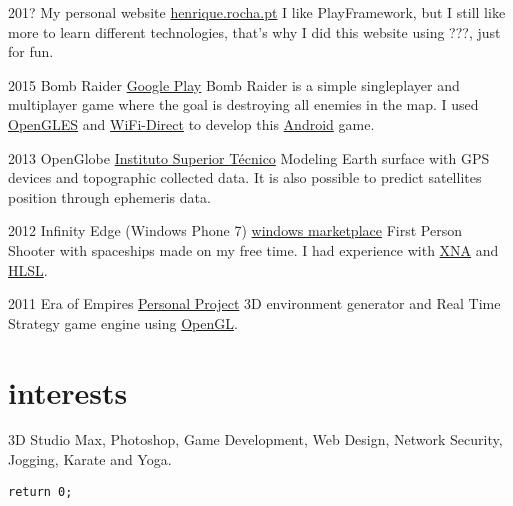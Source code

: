 \documentclass[]{friggeri-cv}
\begin{document}
\begin{entrylist}
  \entry
    {201?}
    {My personal website}
    {\href{http://play.google.com/store/apps/details?id=pt.ist.bombraider}{henrique.rocha.pt}}
    {I like PlayFramework, but I still like more to learn different technologies, that's why I did this website using ???, just for fun.}
  
  \entry
    {2015}
    {Bomb Raider}
    {\href{http://play.google.com/store/apps/details?id=pt.ist.bombraider}{Google Play}}
    {Bomb Raider is a simple singleplayer and multiplayer game where the goal is destroying all enemies in the map. I used \underline{OpenGLES} and \underline{WiFi-Direct} to develop this \underline{Android} game.}

  \entry
    {2013}
    {OpenGlobe}
    {\href{http://web.ist.utl.pt/ist168621/?page=10}{Instituto Superior Técnico}}
    {Modeling Earth surface with GPS devices and topographic collected data. It is also possible to predict satellites position through ephemeris data.}

  \entry
    {2012}
    {Infinity Edge (Windows Phone 7)}
    {\href{http://www.windowsphone.com/en-us/store/app/infinity-edge/05516463-3a89-4351-996e-62e5b4519aeb}{windows marketplace}}
    {First Person Shooter with spaceships made on my free time. I had experience with \underline{XNA} and \underline{HLSL}.}

  \entry
    {2011}
    {Era of Empires}
    {\href{http://web.ist.utl.pt/ist168621/?page=8}{Personal Project}}
    {3D environment generator and Real Time Strategy game engine using \underline{OpenGL}.}


\end{entrylist}

\section{interests}
    3D Studio Max, Photoshop, Game Development, Web Design, Network Security, Jogging, Karate and Yoga.

	
%
%


\begin{lstlisting}
return 0;
\end{lstlisting}
\end{document}
